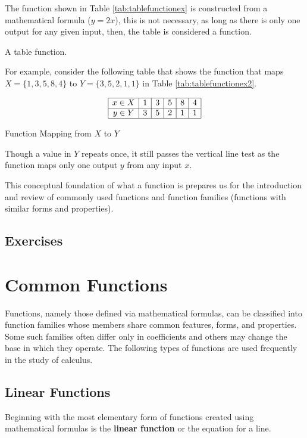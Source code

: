 The function shown in Table \ref{tab:tablefunctionex} is constructed from a mathematical formula ($y = 2x$), this is not necessary, as long as there is only one output for any given input, then, the table is considered a function.

\begin{example} A table function.
    
    For example, consider the following table that shows the function that maps $X = \{1,3,5,8,4\}$ to $Y = \{3,5,2,1,1\}$ in Table \ref{tab:tablefunctionex2}.
    \begin{table}[!ht]
        \centering
        \[
            \begin{array}{|*{6}{c|}}
                \hline
                x \in X & 1 & 3 & 5 & 8 & 4 \\
                \hline
                y \in Y & 3 & 5 & 2 & 1 & 1 \\
                \hline
            \end{array}
        \]
        \caption{Function Mapping from \( X \) to \( Y \)}
        \label{tab:tablefunctionex2}
    \end{table}
    Though a value in $Y$ repeats once, it still passes the vertical line test as the function maps only one output $y$ from any input $x$.
\end{example}

This conceptual foundation of what a  function is prepares us for the introduction and review of commonly used functions and function families (functions with similar forms and properties).

\subsection*{Exercises}

\section{Common Functions}
Functions, namely those defined via mathematical formulas, can be classified into function families whose members share common features, forms, and properties. Some such families often differ only in coefficients and others may change the base in which they operate. The following types of functions are used frequently in the study of calculus.

\subsection{Linear Functions}
Beginning with the most elementary form of functions created using mathematical formulas is the \textbf{linear function} or the equation for a line.

